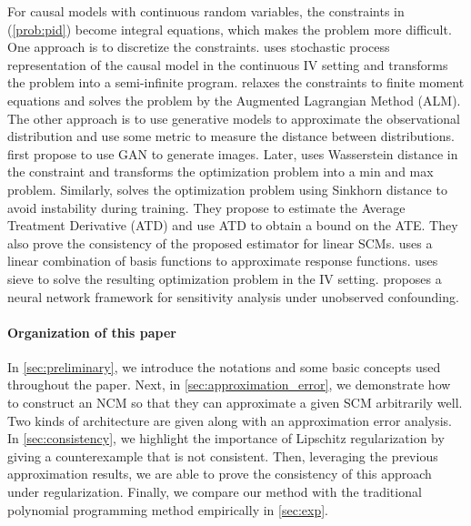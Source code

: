 \documentclass[12pt]{article}
\theoremstyle{plain}
\theoremstyle{definition}
\theoremstyle{remark}
\begin{document}
For causal models with continuous random variables, the constraints in (\ref{prob:pid}) become integral equations, which makes the problem more difficult. One approach is to discretize the constraints. \cite{gunsiliusPathsamplingMethodPartially2020} uses stochastic process representation of the causal model in the continuous IV setting and transforms the problem into a semi-infinite program.  \cite{kilbertusClassAlgorithmsGeneral2020} relaxes the constraints to finite moment equations and solves the problem by the Augmented Lagrangian Method (ALM). The other approach is to use generative models to approximate the observational distribution and use some metric to measure the distance between distributions. \cite{kocaoglu2017causalgan} first propose to use GAN to generate images. Later, \cite{huGenerativeAdversarialFramework2021} uses Wasserstein distance in the constraint and transforms the optimization problem into a min and max problem. Similarly, \cite{balazadehPartialIdentificationTreatment2022} solves the optimization problem using Sinkhorn distance to avoid instability during training. They propose to estimate the Average Treatment Derivative (ATD) and use ATD to obtain a bound on the ATE. They also prove the consistency of the proposed estimator for linear SCMs. \cite{padhStochasticCausalProgramming2023} uses a linear combination of basis functions to approximate response functions. \cite{han2024computational} uses sieve 
to solve the resulting optimization problem in the IV setting. \cite{frauenNeuralFrameworkGeneralized2024} proposes a neural network framework for sensitivity analysis under unobserved confounding. \par

\paragraph{Organization of this paper} In \cref{sec:preliminary}, we introduce the notations and some basic concepts used throughout the paper. Next, in \cref{sec:approximation_error}, we demonstrate how to construct an NCM so that they can approximate a given SCM arbitrarily well. Two kinds of architecture are given along with an approximation error analysis. In \cref{sec:consistency}, we highlight the importance of Lipschitz regularization by giving a counterexample that is not consistent. Then, leveraging the previous approximation results, we are able to prove the consistency of this approach under regularization. Finally, we compare our method with the traditional polynomial programming method empirically in \cref{sec:exp}.
\end{document}
